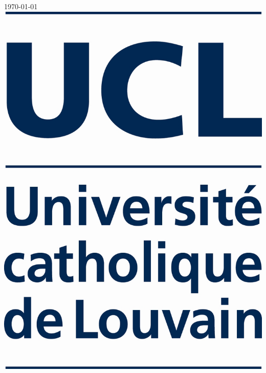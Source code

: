 \begin{titlepage}
		
		
		{\large \today}\\[2cm] %
		
		

		\includegraphics[scale=0.10]{logo_UCL_NEW_janv2013.JPG}\\[1cm] %


\end{titlepage}
